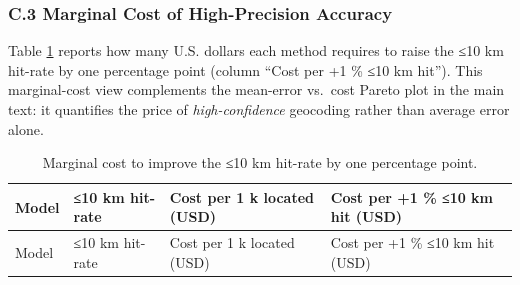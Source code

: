 \documentclass[
  10pt,
  twocolumn]{article}
\begin{document}
\subsubsection{C.3 Marginal Cost of High-Precision
Accuracy}\label{c.3-marginal-cost-of-high-precision-accuracy}

Table \ref{tbl:cost_marginal} reports how many U.S. dollars each method
requires to raise the ≤10 km hit-rate by one percentage point (column
``Cost per +1 \% ≤10 km hit''). This marginal-cost view complements the
mean-error vs.~cost Pareto plot in the main text: it quantifies the
price of \emph{high-confidence} geocoding rather than average error
alone.

\begin{longtable}[]{@{}
  >{\raggedright\arraybackslash}p{}
  >{\raggedright\arraybackslash}p{}
  >{\raggedright\arraybackslash}p{}
  >{\raggedright\arraybackslash}p{}@{}}
\caption{\label{tbl:cost_marginal}Marginal cost to improve the ≤10 km
hit-rate by one percentage point.}\tabularnewline
\toprule\noalign{}
\begin{minipage}[b]{\linewidth}\raggedright
Model
\end{minipage} & \begin{minipage}[b]{\linewidth}\raggedright
≤10 km hit-rate
\end{minipage} & \begin{minipage}[b]{\linewidth}\raggedright
Cost per 1 k located (USD)
\end{minipage} & \begin{minipage}[b]{\linewidth}\raggedright
Cost per +1 \% ≤10 km hit (USD)
\end{minipage} \\
\midrule\noalign{}
\endfirsthead
\toprule\noalign{}
\begin{minipage}[b]{\linewidth}\raggedright
Model
\end{minipage} & \begin{minipage}[b]{\linewidth}\raggedright
≤10 km hit-rate
\end{minipage} & \begin{minipage}[b]{\linewidth}\raggedright
Cost per 1 k located (USD)
\end{minipage} & \begin{minipage}[b]{\linewidth}\raggedright
Cost per +1 \% ≤10 km hit (USD)
\end{minipage} \\

\end{longtable}
\end{document}
